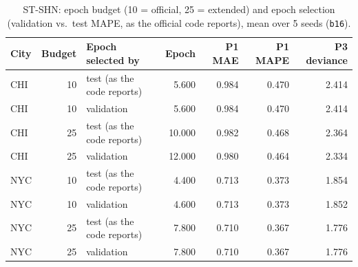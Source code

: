 \documentclass[11pt]{article}
\begin{document}
\begin{table}[H]\centering\scriptsize\setlength{\tabcolsep}{3pt}
\caption{ST-SHN: epoch budget (10 = official, 25 = extended) and epoch selection (validation vs.\ test MAPE, as the official code reports), mean over 5 seeds (\texttt{b16}).}\label{tab:s4}
\begin{tabularx}{\linewidth}{lrlrrrr}\toprule
City & Budget & Epoch selected by & Epoch & P1 MAE & P1 MAPE & P3 deviance\\\midrule
CHI & 10 & test (as the code reports) & 5.600 & 0.984 & 0.470 & 2.414 \\
CHI & 10 & validation & 5.600 & 0.984 & 0.470 & 2.414 \\
CHI & 25 & test (as the code reports) & 10.000 & 0.982 & 0.468 & 2.364 \\
CHI & 25 & validation & 12.000 & 0.980 & 0.464 & 2.334 \\
NYC & 10 & test (as the code reports) & 4.400 & 0.713 & 0.373 & 1.854 \\
NYC & 10 & validation & 4.600 & 0.713 & 0.373 & 1.852 \\
NYC & 25 & test (as the code reports) & 7.800 & 0.710 & 0.367 & 1.776 \\
NYC & 25 & validation & 7.800 & 0.710 & 0.367 & 1.776 \\
\bottomrule\end{tabularx}\end{table}
\end{document}

